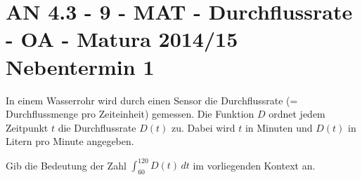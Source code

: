 \section{AN 4.3 - 9 - MAT - Durchflussrate - OA - Matura 2014/15 Nebentermin 1}

\begin{beispiel}[AN 4.3]{1} %
In einem Wasserrohr wird durch einen Sensor die Durchflussrate (= Durchflussmenge pro Zeiteinheit) gemessen. Die Funktion $D$ ordnet jedem Zeitpunkt $t$ die Durchflussrate $D(t)$ zu. Dabei wird $t$ in Minuten und $D(t)$ in Litern pro Minute angegeben.

Gib die Bedeutung der Zahl $\displaystyle\int_{60}^{120}{D(t)\,dt}$ im vorliegenden Kontext an.

\end{beispiel}